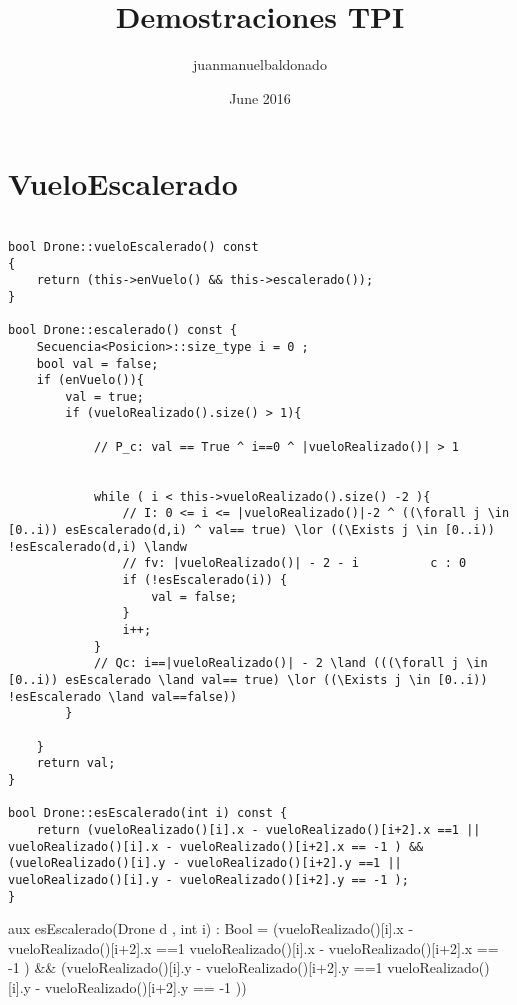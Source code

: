 \documentclass{article}
\title{Demostraciones TPI}
\author{juanmanuelbaldonado }
\date{June 2016}
\begin{document}
\maketitle

\section{VueloEscalerado}

\begin{lstlisting}

bool Drone::vueloEscalerado() const
{
	return (this->enVuelo() && this->escalerado());
}

bool Drone::escalerado() const {
	Secuencia<Posicion>::size_type i = 0 ;
	bool val = false; 
	if (enVuelo()){
		val = true;
		if (vueloRealizado().size() > 1){
		    
		    // P_c: val == True ^ i==0 ^ |vueloRealizado()| > 1
		 
		    
			while ( i < this->vueloRealizado().size() -2 ){
			    // I: 0 <= i <= |vueloRealizado()|-2 ^ ((\forall j \in [0..i)) esEscalerado(d,i) ^ val== true) \lor ((\Exists j \in [0..i)) !esEscalerado(d,i) \landw
		     	// fv: |vueloRealizado()| - 2 - i          c : 0
				if (!esEscalerado(i)) {
					val = false;
				}
				i++;
			}
			// Qc: i==|vueloRealizado()| - 2 \land (((\forall j \in [0..i)) esEscalerado \land val== true) \lor ((\Exists j \in [0..i)) !esEscalerado \land val==false))
		}

	}
	return val;
}

bool Drone::esEscalerado(int i) const {
	return (vueloRealizado()[i].x - vueloRealizado()[i+2].x ==1 || vueloRealizado()[i].x - vueloRealizado()[i+2].x == -1 ) && (vueloRealizado()[i].y - vueloRealizado()[i+2].y ==1 || vueloRealizado()[i].y - vueloRealizado()[i+2].y == -1 );
}

\end{lstlisting}



aux esEscalerado(Drone d , int i) : Bool = { (vueloRealizado()[i].x - vueloRealizado()[i+2].x ==1 \lor vueloRealizado()[i].x - vueloRealizado()[i+2].x == -1 ) && (vueloRealizado()[i].y - vueloRealizado()[i+2].y ==1 \lor vueloRealizado()[i].y - vueloRealizado()[i+2].y == -1 ))} 



\maketitle
\end{document}
